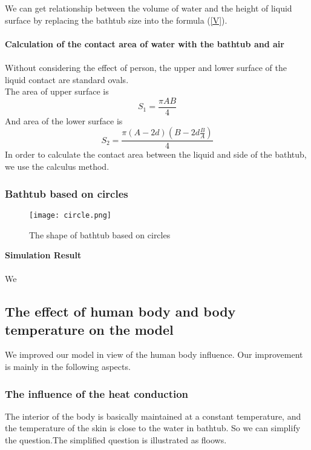 \documentclass{mcmthesis}
\begin{document}
\indent We can get relationship between the volume of water and the height of liquid surface by replacing the bathtub size into the formula (\ref{V}).\\\\
\textbf{Calculation of the contact area of water with the bathtub and air} \\\\
\indent Without considering the effect of person, the upper and lower surface of the liquid contact are standard ovals.\\
\indent The area of upper surface is\\
\begin{equation}
S_{1}=\frac{\pi AB}{4}
\end{equation}
\indent And area of the lower surface is\\
\begin{equation}
	S_{2}=\frac{\pi (A-2d)(B-2d\frac{B}{A})}{4}
\end{equation}
\indent In order to calculate the contact area between the liquid and side of the bathtub, we use the calculus method.



\subsubsection{Bathtub based on circles}
\begin{figure}[H]
\centerline{\texttt{[image: circle.png]}}
\caption{The shape of bathtub based on circles}
\label{circle}	
\end{figure}
\noindent
\textbf{Simulation Result}\\\\
We

\subsection{The effect of human body and body temperature on the model}
We improved our model in view of the human body influence. Our improvement is mainly in the following aspects.
\subsubsection{The influence of the heat conduction}%
The interior of the body is basically maintained at a constant temperature, and the temperature of the skin is close to the water in bathtub. So we can simplify the question.The simplified question is illustrated as floows.\\
\end{document}
